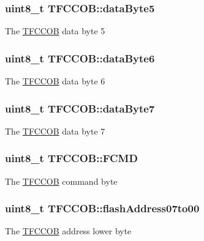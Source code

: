 \subsubsection[{data\+Byte5}]{\setlength{\rightskip}{0pt plus 5cm}uint8\+\_\+t T\+F\+C\+C\+O\+B\+::data\+Byte5}\label{struct_t_f_c_c_o_b_a8947206860f9581c055a4bddacac960f}
The \hyperlink{struct_t_f_c_c_o_b}{T\+F\+C\+C\+O\+B} data byte 5 \hypertarget{struct_t_f_c_c_o_b_aa0b944b3ea37a8c0f275cc333214cf3a}{}
\subsubsection[{data\+Byte6}]{\setlength{\rightskip}{0pt plus 5cm}uint8\+\_\+t T\+F\+C\+C\+O\+B\+::data\+Byte6}\label{struct_t_f_c_c_o_b_aa0b944b3ea37a8c0f275cc333214cf3a}
The \hyperlink{struct_t_f_c_c_o_b}{T\+F\+C\+C\+O\+B} data byte 6 \hypertarget{struct_t_f_c_c_o_b_a237194280ea074bd46e909de1d977e07}{}
\subsubsection[{data\+Byte7}]{\setlength{\rightskip}{0pt plus 5cm}uint8\+\_\+t T\+F\+C\+C\+O\+B\+::data\+Byte7}\label{struct_t_f_c_c_o_b_a237194280ea074bd46e909de1d977e07}
The \hyperlink{struct_t_f_c_c_o_b}{T\+F\+C\+C\+O\+B} data byte 7 \hypertarget{struct_t_f_c_c_o_b_a6c5936523b8b63cbaaeed247f88f8e41}{}
\subsubsection[{F\+C\+M\+D}]{\setlength{\rightskip}{0pt plus 5cm}uint8\+\_\+t T\+F\+C\+C\+O\+B\+::\+F\+C\+M\+D}\label{struct_t_f_c_c_o_b_a6c5936523b8b63cbaaeed247f88f8e41}
The \hyperlink{struct_t_f_c_c_o_b}{T\+F\+C\+C\+O\+B} command byte \hypertarget{struct_t_f_c_c_o_b_afd754933fa5ff69f2c75d80a094c2f95}{}
\subsubsection[{flash\+Address07to00}]{\setlength{\rightskip}{0pt plus 5cm}uint8\+\_\+t T\+F\+C\+C\+O\+B\+::flash\+Address07to00}\label{struct_t_f_c_c_o_b_afd754933fa5ff69f2c75d80a094c2f95}
The \hyperlink{struct_t_f_c_c_o_b}{T\+F\+C\+C\+O\+B} address lower byte \hypertarget{struct_t_f_c_c_o_b_a96b625dc57b3ecdf9ceca8045404bc6b}{}
